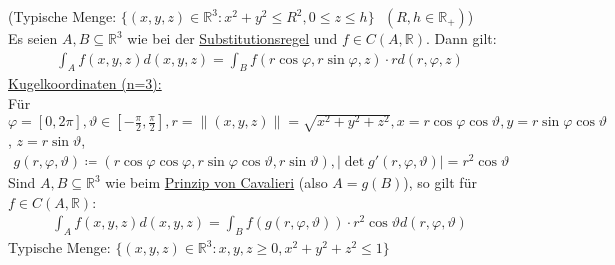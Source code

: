 (Typische Menge: $ \{ (x,y,z) \in \mathbb{R}^3: x^2+y^2 \leq R^2, 0 \leq z \leq h\} \text{ } (R,h \in \mathbb{R}_+)$)\\
Es seien $A,B \subseteq \mathbb{R}^3$ wie bei der \hyperref[sec: Sub]{Substitutionsregel} und $f \in C(A,\mathbb{R})$. Dann gilt: 
\begin{align*}
    \int_A f(x,y,z) d(x,y,z) = \int_B f(r \cos \varphi, r \sin \varphi, z) \cdot r d(r,\varphi,z)
\end{align*}
\underline{Kugelkoordinaten (n=3):} \\
Für $\varphi = [0,2\pi], \vartheta \in [-\frac{\pi}{2}, \frac{\pi}{2}], r=\lVert (x,y,z)\rVert = \sqrt{x^2+y^2+z^2}, x= r\cos \varphi \cos \vartheta, y=r \sin \varphi \cos \vartheta$,
$z=r \sin \vartheta$,
\begin{align*}
    g(r,\varphi,\vartheta) \coloneqq (r\cos \varphi \cos \varphi, r \sin \varphi \cos \vartheta, r \sin \vartheta), \lvert \det g'(r,\varphi,\vartheta)\rvert = r^2 \cos \vartheta
\end{align*}
Sind $A,B \subseteq \mathbb{R}^3$ wie beim \hyperref[sec: Cavalieri]{Prinzip von Cavalieri} (also $A=g(B)$), so gilt für $f \in C(A,\mathbb{R})$:
\begin{align*}
    \int_A f(x,y,z) d(x,y,z) = \int_B f(g(r,\varphi,\vartheta)) \cdot r^2 \cos \vartheta d(r,\varphi,\vartheta)
\end{align*}
Typische Menge: $\{ (x,y,z) \in \mathbb{R}^3: x,y,z \geq 0, x^2+y^2+z^2 \leq 1\}$